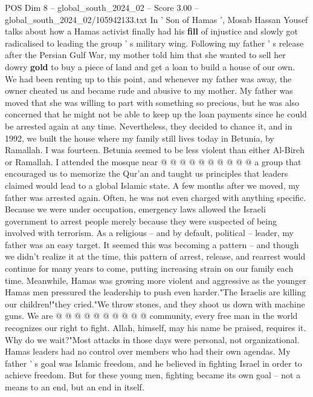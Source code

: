 \begin{textsample}{POS Dim 8 – global\_south\_2024\_02 – Score 3.00 – global\_south\_2024\_02/105942133.txt}  \label{ex:f8_pos_383}
In ' Son of Hamas ', Mosab Hassan Yousef talks about how a Hamas activist finally had his \textbf{fill} of injustice and slowly got radicalised to leading the group ' s military wing.
Following my father ' s release after the Persian Gulf War, my mother told him that she wanted to sell her dowry \textbf{gold} to buy a piece of land and get a loan to build a house of our own.
We had been renting up to this point, and whenever my father was away, the owner cheated us and became rude and abusive to my mother.
My father was moved that she was willing to part with something so precious, but he was also concerned that he might not be able to keep up the loan payments since he could be arrested again at any time.
Nevertheless, they decided to chance it, and in 1992, we built the house where my family still lives today in Betunia, by Ramallah.
I was fourteen.
Betunia seemed to be less violent than either Al-Bireh or Ramallah.
I attended the mosque near @ @ @ @ @ @ @ @ @ @ a group that encouraged us to memorize the Qur'an and taught us principles that leaders claimed would lead to a global Islamic state.
A few months after we moved, my father was arrested again.
Often, he was not even charged with anything specific.
Because we were under occupation, emergency laws allowed the Israeli government to arrest people merely because they were suspected of being involved with terrorism.
As a religious -- and by default, political -- leader, my father was an easy target.
It seemed this was becoming a pattern -- and though we didn't realize it at the time, this pattern of arrest, release, and rearrest would continue for many years to come, putting increasing strain on our family each time.
Meanwhile, Hamas was growing more violent and aggressive as the younger Hamas men pressured the leadership to push even harder."The Israelis are killing our children!"they cried."We throw stones, and they shoot us down with machine guns.
We are @ @ @ @ @ @ @ @ @ @ community, every free man in the world recognizes our right to fight.
Allah, himself, may his name be praised, requires it.
Why do we wait?"Most attacks in those days were personal, not organizational.
Hamas leaders had no control over members who had their own agendas.
My father ' s goal was Islamic freedom, and he believed in fighting Israel in order to achieve freedom.
But for these young men, fighting became its own goal -- not a means to an end, but an end in itself.

\end{textsample}
